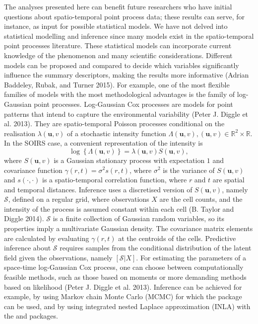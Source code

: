 The analyses presented here can benefit future researchers who have initial questions about spatio-temporal point process data; these results can serve, for instance, as input for possible statistical models. We have not delved into statistical modelling and inference since many models exist in the spatio-temporal point processes literature. These statistical models can incorporate current knowledge of the phenomenon and many scientific considerations. Different models can be proposed and compared to decide which variables significantly influence the summary descriptors, making the results more informative (Adrian Baddeley, Rubak, and Turner 2015). For example, one of the most flexible families of models with the most methodological advantages is the family of log-Gaussian point processes. Log-Gaussian Cox processes are models for point patterns that intend to capture the environmental variability (Peter J. Diggle et al. 2013). They are spatio-temporal Poisson processes conditional on the realisation \(\lambda(\mathbf{u},v)\) of a stochastic intensity function \(\Lambda(\mathbf{u},v), (\mathbf{u},v)\in \mathbb{R}^2\times \mathbb{R}\). In the SOIRS case, a convenient representation of the intensity is
\[
    \log \left\{ \Lambda(\mathbf{u},v) \right\}= \lambda(\mathbf{u},v)S(\mathbf{u},v),
\]
where \(S(\mathbf{u},v)\) is a Gaussian stationary process with expectation \(1\) and covariance function \(\gamma(r,t)=\sigma^2 s(r,t)\), where \(\sigma^2\) is the variance of \(S(\mathbf{u}, v)\) and \(s(\cdot, \cdot)\) is a spatio-temporal correlation function, where \(r\) and \(t\) are spatial and temporal distances. Inference uses a discretised version of \(S(\mathbf{u},v)\), namely \(\mathcal{S}\), defined on a regular grid, where observations \(X\) are the cell counts, and the intensity of the process is assumed constant within each cell (B. Taylor and Diggle 2014). \(\mathcal{S}\) is a finite collection of Gaussian random variables, so its properties imply a multivariate Gaussian density. The covariance matrix elements are calculated by evaluating \(\gamma(r,t)\) at the centroids of the cells. Predictive inference about \(\mathcal{S}\) requires samples from the conditional distribution of the latent field given the observations, namely \([\mathcal{S}|X]\). For estimating the parameters of a space-time log-Gaussian Cox process, one can choose between computationally feasible methods, such as those based on moments or more demanding methods based on likelihood (Peter J. Diggle et al. 2013). Inference can be achieved for example, by using Markov chain Monte Carlo (MCMC) for which the  package can be used, and by using integrated nested Laplace approximation (INLA) with the  and  packages.

